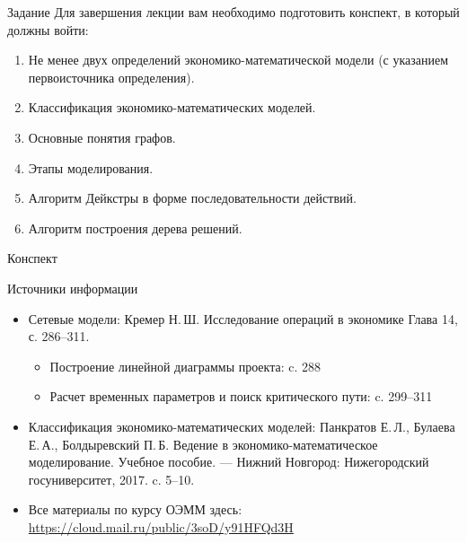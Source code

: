 \documentclass[unicode,11pt,notheorems]{beamer}
\begin{document}
\begin{frame}{Задание}
Для завершения лекции вам необходимо подготовить конспект, в который должны войти:
	\begin{enumerate}
		\item 
			 Не менее двух определений экономико-математической модели (с указанием первоисточника определения).
		\item 
			 Классификация экономико-математических моделей.
		\item 
			 Основные понятия графов.
		\item 
			  Этапы моделирования.
		\item 
			 Алгоритм Дейкстры в форме последовательности действий.
		\item 
			 Алгоритм построения дерева решений.
	\end{enumerate}

Конспект

\end{frame}
\begin{frame}{Источники информации}
\begin{itemize}
\item 
	Сетевые модели:  Кремер  Н.\,Ш. Исследование операций в экономике Глава 14, с. 286--311.
	\begin{itemize}
		\item  
			Построение линейной диаграммы проекта: c. 288
		\item 
			 Расчет временных параметров и поиск критического пути:  c. 299--311
	\end{itemize}
\item 
	Классификация экономико-математических моделей: 	
	Панкратов Е.\,Л., Булаева Е.\,А., Болдыревский П.\,Б. Ведение в экономико-математическое моделирование. Учебное пособие. --- Нижний Новгород: Нижегородский госуниверситет, 2017.  c. 5--10.
\bigskip
\item 
	Все материалы по курсу ОЭММ здесь:
{\color{blue}\url{https://cloud.mail.ru/public/3soD/y91HFQd3H}}

\end{itemize}

\end{frame}
\end{document}
